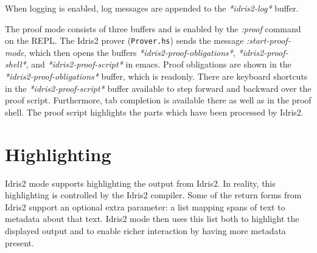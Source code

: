 \documentclass{article}
\begin{document}
When logging is enabled, log messages are appended to the \emph{*idris2-log*} buffer.

The proof mode consists of three buffers and is enabled by the \emph{:proof} command on the REPL.
The Idris2 prover (\texttt{Prover.hs}) sends the message \emph{:start-proof-mode}, which then opens the buffers \emph{*idris2-proof-obligations*}, \emph{*idris2-proof-shell*}, and \emph{*idris2-proof-script*} in emacs.
Proof obligations are shown in the \emph{*idris2-proof-obligations*} buffer, which is readonly.
There are keyboard shortcuts in the \emph{*idris2-proof-script*} buffer available to step forward and backward over the proof script.
Furthermore, tab completion is available there as well as in the proof shell.
The proof script highlights the parts which have been processed by Idris2.

\section{Highlighting}
Idris2 mode supports highlighting the output from Idris2.
In reality, this highlighting is controlled by the Idris2 compiler.
Some of the return forms from Idris2 support an optional extra parameter: a list mapping spans of text to metadata about that text.
Idris2 mode then uses this list both to highlight the displayed output and to enable richer interaction by having more metadata present.
\end{document}
